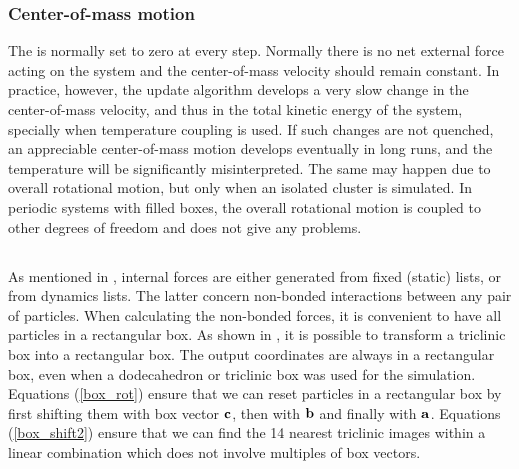 \subsubsection*{Center-of-mass motion}
The  is normally set to zero at
every step.  Normally there is no net external force acting on the
system and the center-of-mass velocity should remain constant. In
practice, however, the update algorithm develops a very slow change in
the center-of-mass velocity, and thus in the total kinetic energy of
the system, specially when temperature coupling is used. If such
changes are not quenched, an appreciable center-of-mass motion
develops eventually in long runs, and the temperature will be
significantly misinterpreted. The same may happen due to overall
rotational motion, but only when an isolated cluster is simulated. In
periodic systems with filled boxes, the overall rotational motion is
coupled to other degrees of freedom and does not give any problems.


\subsection{}
\label{subsec:ns}
As mentioned in , internal forces are
either generated from fixed (static) lists, or from dynamics lists.
The latter concern non-bonded interactions between any pair of particles.
When calculating the non-bonded forces, it is convenient to have all
particles in a rectangular box.
As shown in , it is possible to transform a
triclinic box into a rectangular box.
The output coordinates are always in a rectangular box, even when a
dodecahedron or triclinic box was used for the simulation.
Equations (\ref{box_rot}) ensure
that we can reset particles in a rectangular box by first shifting them with
box vector ${\bf c}$, then with ${\bf b}$ and finally with ${\bf a}$.
Equations (\ref{box_shift2}) ensure that we can find the 14 nearest 
triclinic images within a linear combination which does not involve
multiples of box vectors.

